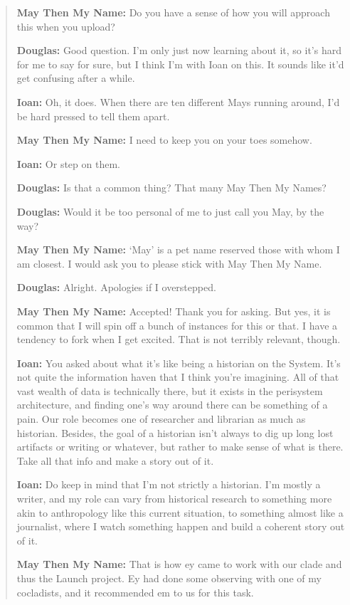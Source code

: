 \begin{quote}
\textbf{May Then My Name:} Do you have a sense of how you will approach this when you upload?

\textbf{Douglas:} Good question. I'm only just now learning about it, so it's hard for me to say for sure, but I think I'm with Ioan on this. It sounds like it'd get confusing after a while.

\textbf{Ioan:} Oh, it does. When there are ten different Mays running around, I'd be hard pressed to tell them apart.

\textbf{May Then My Name:} I need to keep you on your toes somehow.

\textbf{Ioan:} Or step on them.

\textbf{Douglas:} Is that a common thing? That many May Then My Names?

\textbf{Douglas:} Would it be too personal of me to just call you May, by the way?

\textbf{May Then My Name:} `May' is a pet name reserved those with whom I am closest. I would ask you to please stick with May Then My Name.

\textbf{Douglas:} Alright. Apologies if I overstepped.

\textbf{May Then My Name:} Accepted! Thank you for asking. But yes, it is common that I will spin off a bunch of instances for this or that. I have a tendency to fork when I get excited. That is not terribly relevant, though.

\textbf{Ioan:} You asked about what it's like being a historian on the System. It's not quite the information haven that I think you're imagining. All of that vast wealth of data is technically there, but it exists in the perisystem architecture, and finding one's way around there can be something of a pain. Our role becomes one of researcher and librarian as much as historian. Besides, the goal of a historian isn't always to dig up long lost artifacts or writing or whatever, but rather to make sense of what is there. Take all that info and make a story out of it.

\textbf{Ioan:} Do keep in mind that I'm not strictly a historian. I'm mostly a writer, and my role can vary from historical research to something more akin to anthropology like this current situation, to something almost like a journalist, where I watch something happen and build a coherent story out of it.

\textbf{May Then My Name:} That is how ey came to work with our clade and thus the Launch project. Ey had done some observing with one of my cocladists, and it recommended em to us for this task.


\end{quote}
